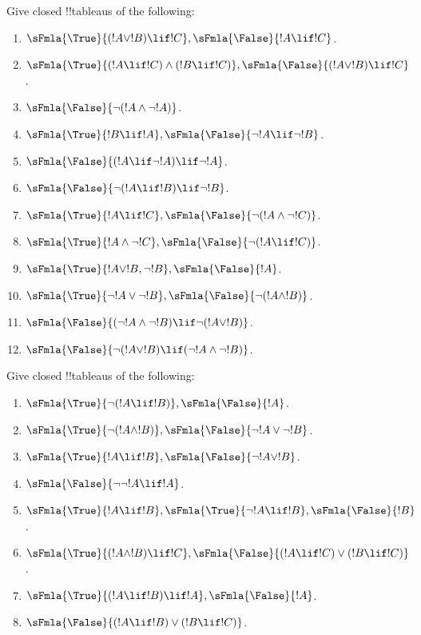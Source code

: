 \begin{prob}
Give closed !!{tableau}s of the following:
\begin{enumerate}
\item $\sFmla{\True}{(!A \lor !B) \lif !C}, \sFmla{\False}{!A \lif !C}$.
\item $\sFmla{\True}{(!A \lif !C) \land (!B \lif !C)}, \sFmla{\False}{(!A \lor !B) \lif !C}$.
\item $\sFmla{\False}{\lnot(!A \land \lnot !A)}$.
\item $\sFmla{\True}{!B \lif !A}, \sFmla{\False}{\lnot !A \lif \lnot !B}$.
\item $\sFmla{\False}{(!A \lif \lnot !A) \lif \lnot !A}$.
\item $\sFmla{\False}{\lnot(!A \lif !B) \lif \lnot !B}$.
\item $\sFmla{\True}{!A \lif !C}, \sFmla{\False}{\lnot (!A \land \lnot !C)}$.
\item $\sFmla{\True}{!A \land \lnot !C}, \sFmla{\False}{\lnot (!A \lif !C)}$.
\item $\sFmla{\True}{!A \lor !B, \lnot !B}, \sFmla{\False}{!A}$.
\item $\sFmla{\True}{\lnot !A \lor \lnot !B}, \sFmla{\False}{\lnot(!A \land !B)}$.
\item $\sFmla{\False}{(\lnot !A \land \lnot !B) \lif\lnot(!A \lor !B)}$.
\item $\sFmla{\False}{\lnot(!A \lor !B) \lif (\lnot !A \land \lnot !B)}$.
\end{enumerate}
\end{prob}

\begin{prob}
Give closed !!{tableau}s of the following:
\begin{enumerate}
\item $\sFmla{\True}{\lnot(!A \lif !B)}, \sFmla{\False}{!A}$.
\item $\sFmla{\True}{\lnot(!A \land !B)}, \sFmla{\False}{\lnot !A \lor \lnot !B}$.
\item $\sFmla{\True}{!A \lif !B}, \sFmla{\False}{\lnot !A \lor !B}$.
\item $\sFmla{\False}{\lnot \lnot !A \lif !A}$.
\item $\sFmla{\True}{!A \lif !B}, \sFmla{\True}{\lnot !A \lif !B}, \sFmla{\False}{!B}$.
\item $\sFmla{\True}{(!A \land !B) \lif !C}, \sFmla{\False}{(!A \lif !C) \lor (!B \lif !C)}$.
\item $\sFmla{\True}{(!A \lif !B) \lif !A}, \sFmla{\False}{!A}$.
\item $\sFmla{\False}{(!A \lif !B) \lor (!B \lif !C)}$.
\end{enumerate}
\end{prob}




